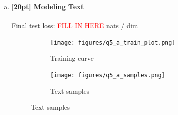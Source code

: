 \documentclass{article}
\begin{document}
\begin{enumerate}[(a)]
\item {\bf [20pt] Modeling Text} \\\\
Final test loss: \textcolor{red}{FILL IN HERE}  nats / dim
\begin{figure}[H]
    \centering
\end{figure}

\begin{figure}[H]
    \centering
\end{figure}

\begin{figure}[H]
    \centering
    \begin{subfigure}{0.3\textwidth}
        \centering
        \texttt{[image: figures/q5\_a\_train\_plot.png]}
        \caption{Training curve}
    \end{subfigure}
    \hspace{0.2in}
    \begin{subfigure}{0.65\textwidth}
        \centering
        \texttt{[image: figures/q5\_a\_samples.png]}
        \caption{Text samples}
    \end{subfigure}
\end{figure}

\end{enumerate}

\newpage
{}
\end{document}
